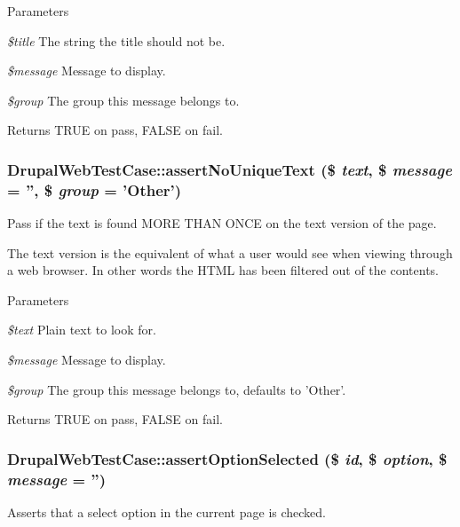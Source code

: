 \begin{DoxyParams}{Parameters}
\item[{\em \$title}]The string the title should not be. \item[{\em \$message}]Message to display. \item[{\em \$group}]The group this message belongs to. \end{DoxyParams}
\begin{DoxyReturn}{Returns}
TRUE on pass, FALSE on fail. 
\end{DoxyReturn}
\hypertarget{classDrupalWebTestCase_a058c82a867e22a61b68891a009294e7b}{
\subsubsection[{assertNoUniqueText}]{\setlength{\rightskip}{0pt plus 5cm}DrupalWebTestCase::assertNoUniqueText (\$ {\em text}, \/  \$ {\em message} = {\ttfamily ''}, \/  \$ {\em group} = {\ttfamily 'Other'})}}
\label{classDrupalWebTestCase_a058c82a867e22a61b68891a009294e7b}
Pass if the text is found MORE THAN ONCE on the text version of the page.

The text version is the equivalent of what a user would see when viewing through a web browser. In other words the HTML has been filtered out of the contents.


\begin{DoxyParams}{Parameters}
\item[{\em \$text}]Plain text to look for. \item[{\em \$message}]Message to display. \item[{\em \$group}]The group this message belongs to, defaults to 'Other'. \end{DoxyParams}
\begin{DoxyReturn}{Returns}
TRUE on pass, FALSE on fail. 
\end{DoxyReturn}
\hypertarget{classDrupalWebTestCase_a95c2f2a414be5f4f52688c0549ef60ec}{
\subsubsection[{assertOptionSelected}]{\setlength{\rightskip}{0pt plus 5cm}DrupalWebTestCase::assertOptionSelected (\$ {\em id}, \/  \$ {\em option}, \/  \$ {\em message} = {\ttfamily ''})}}
\label{classDrupalWebTestCase_a95c2f2a414be5f4f52688c0549ef60ec}
Asserts that a select option in the current page is checked.


